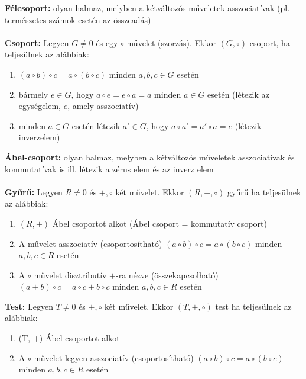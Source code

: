 \documentclass[11pt,a4paper]{article}
\begin{document}
\begin{tcolorbox}[colback=green!5!white,colframe=green!60!black,title= 3. Csoport{,} gyűrű{,} test]
        \textbf{Félcsoport:} olyan halmaz, melyben a kétváltozós műveletek asszociatívak (pl. természetes számok esetén az összeadás)\\\\
        \textbf{Csoport:} Legyen \(G\neq 0\) és egy \(\circ \) művelet (szorzás). Ekkor \((G, \circ )\) csoport, ha teljesülnek az alábbiak:
        \begin{enumerate}
            \item \((a \circ b) \circ c = a \circ (b \circ c)\) minden \(a, b, c \in G\) esetén
            \item bármely \(e \in G\), hogy \(a \circ e = e \circ a = a\) minden \(a \in G\) esetén (létezik az egységelem, \(e\), amely asszociatív)
            \item minden \(a \in G\) esetén létezik \(a' \in G\), hogy \(a \circ a'=a' \circ a = e\) (létezik inverzelem)
        \end{enumerate}
        \textbf{Ábel-csoport:} olyan halmaz, melyben a kétváltozós műveletek asszociatívak és kommutatívak is ill. létezik a zérus elem és az inverz elem\\\\
        \textbf{Gyűrű:}
        Legyen \(R\neq 0\) és \(+, \circ \) két művelet. Ekkor \((R, +, \circ )\) gyűrű ha teljesülnek az alábbiak:
        \begin{enumerate}
            \item \((R, +)\) Ábel csoportot alkot (Ábel csoport = kommutatív csoport)
            \item A  művelet asszociatív (csoportosítható) \((a \circ b) \circ c = a \circ (b \circ c)\) minden \(a, b, c \in R\) esetén
            \item A \(\circ \) művelet disztributív \(+\)-ra nézve (összekapcsolható) \((a + b) \circ c = a \circ c + b \circ c\) minden \(a, b, c \in R\) esetén
        \end{enumerate}
        \textbf{Test:} 
        Legyen \(T \neq 0\) és \(+, \circ \) két művelet. Ekkor \((T, +, \circ)\) test ha teljesülnek az alábbiak:
        \begin{enumerate}
            \item (T, +) Ábel csoportot alkot
            \item A \(\circ\) művelet legyen asszociatív (csoportosítható) \((a \circ b) \circ c = a \circ (b \circ c)\) minden \(a, b, c \in R\) esetén

\end{enumerate}
\end{tcolorbox}
\end{document}
